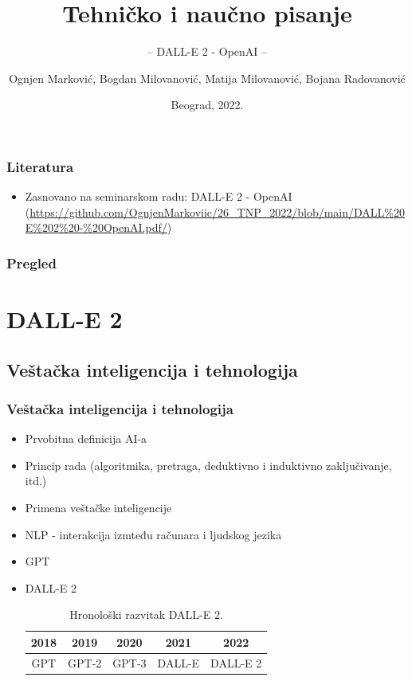 \documentclass{beamer}
\title{Tehničko i naučno pisanje}
\subtitle{-- DALL-E 2 - OpenAI --}
\author{Ognjen Marković, Bogdan Milovanović, Matija Milovanović, Bojana Radovanović}
\institute{Matematički fakultet\\Univerzitet u Beogradu}
\date{
	\footnotesize{Beograd, 2022.}	
}
\begin{document}
\begin{frame}
	\thispagestyle{empty}
	\titlepage
\end{frame}

\addtocounter{framenumber}{-1}

\begin{frame}[fragile]\frametitle{Literatura}
	\begin{itemize}
		\item Zasnovano na seminarskom radu: DALL-E 2 - OpenAI
		(\url{https://github.com/OgnjenMarkoviic/26_TNP_2022/blob/main/DALL%20E%202%20-%20OpenAI.pdf/})
	\end{itemize}
\end{frame}

\begin{frame}
	\frametitle{Pregled} %
	\tableofcontents[] 
\end{frame}

\section{DALL-E 2}
\subsection{Veštačka inteligencija i tehnologija}
\begin{frame}[fragile]\frametitle{Veštačka inteligencija i tehnologija}
	\begin{itemize}	
		\item Prvobitna definicija AI-a
		\item Princip rada (algoritmika, pretraga, deduktivno i induktivno zaključivanje, itd.)
		\item Primena veštačke inteligencije
		\item NLP - interakcija izmteđu računara i ljudskog jezika
		\item GPT
		\item DALL-E 2
        \begin{table}[h!]
        \begin{center}
        \vspace{0.5cm}
        \begin{tabular}{|c|c|c|c|c|} \hline
        2018&2019&2020&2021&2022\\ \hline
        GPT&GPT-2&GPT-3 &DALL-E&DALL-E 2\\ \hline
        \end{tabular}
        \label{tab:tabela1}
        \caption{Hronološki razvitak DALL-E 2.}
        \end{center}
        \end{table}
	\end{itemize}
\end{frame}
\end{document}
